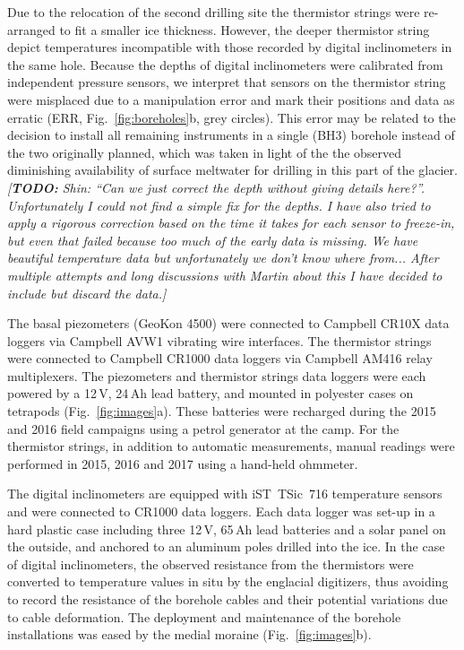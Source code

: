 \documentclass[utf8]{article}
\newcommand{\todo}[1]{\textcolor{c3}{\emph{[\textbf{TODO:} #1]}}}
\begin{document}
    Due to the relocation of the second drilling site the thermistor strings
    were re-arranged to fit a smaller ice thickness. However, the deeper
    thermistor string depict temperatures incompatible with those recorded by
    digital inclinometers in the same hole. Because the depths of digital
    inclinometers were calibrated from independent pressure sensors, we
    interpret that sensors on the thermistor string were misplaced due to a
    manipulation error and mark their positions and data as erratic (ERR,
    Fig.~\ref{fig:boreholes}b, grey circles). This error may be related to the
    decision to install all remaining instruments in a single (BH3) borehole
    instead of the two originally planned, which was taken in light of the
    the observed diminishing availability of surface meltwater for drilling in
    this part of the glacier.
    \todo{Shin: ``Can we just correct the depth without giving details here?''.
          Unfortunately I could not find a simple fix for the depths. I have
          also tried to apply a rigorous correction based on the time it takes
          for each sensor to freeze-in, but even that failed because too much
          of the early data is missing. We have beautiful temperature data but
          unfortunately we don't know where from... After multiple attempts
          and long discussions with Martin about this I have decided to include
          but discard the data.}

    The basal piezometers (GeoKon 4500) were connected to Campbell CR10X data
    loggers via Campbell AVW1 vibrating wire interfaces. The thermistor strings
    \citep[NTC~Fenwal 135-103FAG-J01,][]{Ryser.2014} were connected to Campbell
    CR1000 data loggers via Campbell AM416 relay multiplexers. The piezometers
    and thermistor strings data loggers were each powered by a 12\,V, 24\,Ah
    lead battery, and mounted in polyester cases on tetrapods
    (Fig.~\ref{fig:images}a). These batteries were recharged during the 2015
    and 2016 field campaigns using
    a petrol generator at the camp. For the thermistor strings, in addition to
    automatic measurements, manual readings were performed in 2015, 2016 and
    2017 using a hand-held ohmmeter.

    The digital inclinometers \citep[DIBOSS,][]{Ryser.2014, Ryser.etal.2014,
    Ryser.etal.2014a} are equipped with iST~TSic~716 temperature sensors and
    were connected to CR1000 data loggers. Each data logger
    was set-up in a hard plastic case including three 12\,V, 65\,Ah lead
    batteries and a solar panel on the outside, and anchored to an aluminum
    poles drilled into the ice.
    In the case of digital inclinometers, the observed resistance from the
    thermistors were converted to temperature values in situ by the englacial
    digitizers, thus avoiding to record the resistance of the borehole cables
    and their potential variations due to cable deformation. The deployment and
    maintenance of the borehole installations was eased by the medial moraine
    (Fig.~\ref{fig:images}b).
\end{document}
